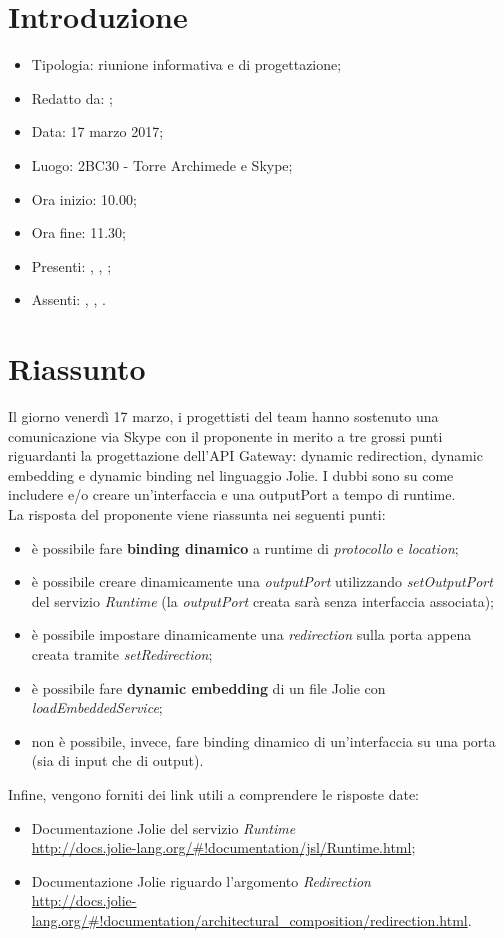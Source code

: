 \section{Introduzione}

	\begin{itemize}
		\item Tipologia: riunione informativa e di progettazione;
		\item Redatto da: \AS;
		\item Data: 17 marzo 2017;
		\item Luogo: 2BC30 - Torre Archimede e Skype;
		\item Ora inizio: 10.00;
		\item Ora fine: 11.30;
		\item Presenti: \AS, \NS, \DAN;	
		\item Assenti: \MC, \AN, \DS.
	\end{itemize}

\section{Riassunto}
Il giorno venerdì 17 marzo, i progettisti del team hanno sostenuto una comunicazione via Skype con il proponente in merito a tre grossi punti riguardanti la progettazione dell'API Gateway: dynamic redirection, dynamic embedding e dynamic binding nel linguaggio Jolie.
I dubbi sono su come includere e/o creare un'interfaccia e una outputPort a tempo di runtime.\\
La risposta del proponente viene riassunta nei seguenti punti:
\begin{itemize}
	\item è possibile fare \textbf{binding dinamico} a runtime di \textit{protocollo} e \textit{location};
	\item è possibile creare dinamicamente una \textit{outputPort} utilizzando \textit{setOutputPort} del servizio \textit{Runtime} (la \textit{outputPort} creata sarà senza interfaccia associata);
	\item è possibile impostare dinamicamente una \textit{redirection} sulla porta appena creata tramite \textit{setRedirection};
	\item è possibile fare \textbf{dynamic embedding} di un file Jolie con \textit{loadEmbeddedService};
	\item non è possibile, invece, fare binding dinamico di un'interfaccia su una porta (sia di input che di output).
\end{itemize}
Infine, vengono forniti dei link utili a comprendere le risposte date:
\begin{itemize}
	\item Documentazione Jolie del servizio \textit{Runtime}\\ \url{http://docs.jolie-lang.org/#!documentation/jsl/Runtime.html};
	\item Documentazione Jolie riguardo l'argomento \textit{Redirection}\\ \url{http://docs.jolie-lang.org/#!documentation/architectural_composition/redirection.html}.
\end{itemize}

